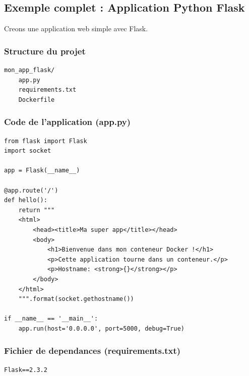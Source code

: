 \documentclass[a4paper,12pt]{article}
\begin{document}
\subsection{Exemple complet : Application Python Flask}
Creons une application web simple avec Flask.

\subsubsection{Structure du projet}
\begin{lstlisting}[caption=Arborescence du projet]
mon_app_flask/
    app.py
    requirements.txt
    Dockerfile
\end{lstlisting}

\subsubsection{Code de l'application (app.py)}
\begin{lstlisting}[style=pythonstyle, caption=Application Flask simple]
from flask import Flask
import socket

app = Flask(__name__)

@app.route('/')
def hello():
    return """
    <html>
        <head><title>Ma super app</title></head>
        <body>
            <h1>Bienvenue dans mon conteneur Docker !</h1>
            <p>Cette application tourne dans un conteneur.</p>
            <p>Hostname: <strong>{}</strong></p>
        </body>
    </html>
    """.format(socket.gethostname())

if __name__ == '__main__':
    app.run(host='0.0.0.0', port=5000, debug=True)
\end{lstlisting}

\subsubsection{Fichier de dependances (requirements.txt)}
\begin{lstlisting}[caption=Demarches Python]
Flask==2.3.2
\end{lstlisting}
\end{document}
